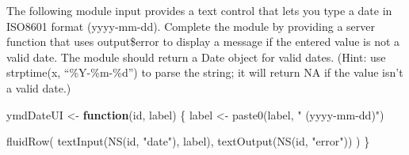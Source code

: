 \documentclass[
]{book}
\newenvironment{Shaded}{\begin{snugshade}}{\end{snugshade}}
\newcommand{\ControlFlowTok}[1]{\textcolor[rgb]{0.13,0.29,0.53}{\textbf{#1}}}
\newcommand{\FunctionTok}[1]{\textcolor[rgb]{0.00,0.00,0.00}{#1}}
\newcommand{\NormalTok}[1]{#1}
\newcommand{\OtherTok}[1]{\textcolor[rgb]{0.56,0.35,0.01}{#1}}
\newcommand{\StringTok}[1]{\textcolor[rgb]{0.31,0.60,0.02}{#1}}
\theoremstyle{definition}
\theoremstyle{definition}
\theoremstyle{definition}
\theoremstyle{definition}
\theoremstyle{remark}
\begin{document}
The following module input provides a text control that lets you type a date in ISO8601 format (yyyy-mm-dd). Complete the module by providing a server function that uses output\$error to display a message if the entered value is not a valid date. The module should return a Date object for valid dates. (Hint: use strptime(x, ``\%Y-\%m-\%d'') to parse the string; it will return NA if the value isn't a valid date.)

\begin{Shaded}
\begin{Highlighting}[]
\NormalTok{ymdDateUI }\OtherTok{\textless{}{-}} \ControlFlowTok{function}\NormalTok{(id, label) \{}
\NormalTok{  label }\OtherTok{\textless{}{-}} \FunctionTok{paste0}\NormalTok{(label, }\StringTok{" (yyyy{-}mm{-}dd)"}\NormalTok{)}

  \FunctionTok{fluidRow}\NormalTok{(}
    \FunctionTok{textInput}\NormalTok{(}\FunctionTok{NS}\NormalTok{(id, }\StringTok{"date"}\NormalTok{), label),}
    \FunctionTok{textOutput}\NormalTok{(}\FunctionTok{NS}\NormalTok{(id, }\StringTok{"error"}\NormalTok{))}
\NormalTok{  )}
\NormalTok{\}}
\end{Highlighting}
\end{Shaded}
\end{document}
